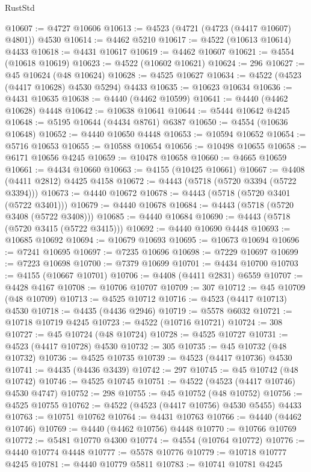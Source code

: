\begin{lexlean}{RustStd}
\begin{coremodule}
@10607 := @4727 @10606
@10613 := @4523 (@4721 (@4723 (@4417 @10607) @4801)) @4530
@10614 := @4462 @5210
@10617 := @4522 (@10613 @10614) @4433
@10618 := @4431 @10617
@10619 := @4462 @10607
@10621 := @4554 (@10618 @10619)
@10623 := @4522 (@10602 @10621)
@10624 := 296
@10627 := @45 @10624 (@48 @10624)
@10628 := @4525 @10627
@10634 := @4522 (@4523 (@4417 @10628) @4530 @5294) @4433
@10635 := @10623 @10634
@10636 := @4431 @10635
@10638 := @4440 (@4462 @10599)
@10641 := @4440 (@4462 @10628) @4448
@10642 := @10638 @10641
@10644 := @5444 @10642 @4245
@10648 := @5195 @10644 (@4434 @8761) @6387
@10650 := @4554 (@10636 @10648)
@10652 := @4440 @10650 @4448
@10653 := @10594 @10652
@10654 := @5716 @10653
@10655 := @10588 @10654
@10656 := @10498 @10655
@10658 := @6171 @10656 @4245
@10659 := @10478 @10658
@10660 := @4665 @10659
@10661 := @4434 @10660
@10663 := @4155 (@10425 @10661)
@10667 := @4408 (@4411 @2812) @4425 @4158
@10672 := @4443 (@5718 (@5720 @3394 (@5722 @3394)))
@10673 := @4440 @10672
@10678 := @4443 (@5718 (@5720 @3401 (@5722 @3401)))
@10679 := @4440 @10678
@10684 := @4443 (@5718 (@5720 @3408 (@5722 @3408)))
@10685 := @4440 @10684
@10690 := @4443 (@5718 (@5720 @3415 (@5722 @3415)))
@10692 := @4440 @10690 @4448
@10693 := @10685 @10692
@10694 := @10679 @10693
@10695 := @10673 @10694
@10696 := @7241 @10695
@10697 := @7235 @10696
@10698 := @7229 @10697
@10699 := @7223 @10698
@10700 := @7379 @10699
@10701 := @4434 @10700
@10703 := @4155 (@10667 @10701)
@10706 := @4408 (@4411 @2831) @6559
@10707 := @4428 @4167
@10708 := @10706 @10707
@10709 := 307
@10712 := @45 @10709 (@48 @10709)
@10713 := @4525 @10712
@10716 := @4523 (@4417 @10713) @4530
@10718 := @4435 (@4436 @2946)
@10719 := @5578 @6032
@10721 := @10718 @10719 @4245
@10723 := @4522 (@10716 @10721)
@10724 := 308
@10727 := @45 @10724 (@48 @10724)
@10728 := @4525 @10727
@10731 := @4523 (@4417 @10728) @4530
@10732 := 305
@10735 := @45 @10732 (@48 @10732)
@10736 := @4525 @10735
@10739 := @4523 (@4417 @10736) @4530
@10741 := @4435 (@4436 @3439)
@10742 := 297
@10745 := @45 @10742 (@48 @10742)
@10746 := @4525 @10745
@10751 := @4522 (@4523 (@4417 @10746) @4530 @4747)
@10752 := 298
@10755 := @45 @10752 (@48 @10752)
@10756 := @4525 @10755
@10762 := @4522 (@4523 (@4417 @10756) @4530 @5455) @4433
@10763 := @10751 @10762
@10764 := @4431 @10763
@10766 := @4440 (@4462 @10746)
@10769 := @4440 (@4462 @10756) @4448
@10770 := @10766 @10769
@10772 := @5481 @10770 @4300
@10774 := @4554 (@10764 @10772)
@10776 := @4440 @10774 @4448
@10777 := @5578 @10776
@10779 := @10718 @10777 @4245
@10781 := @4440 @10779 @5811
@10783 := @10741 @10781 @4245

\end{coremodule}
\end{lexlean}
